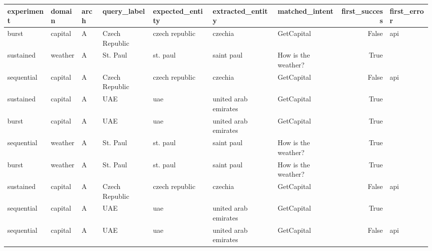\begin{tabular}{lllllllrl}
\toprule
experiment & domain & arch & query_label & expected_entity & extracted_entity & matched_intent & first_success & first_error \\
\midrule
burst & capital & A & Czech Republic & czech republic & czechia & GetCapital & False & api \\
sustained & weather & A & St. Paul & st. paul & saint paul & How is the weather? & True &  \\
sequential & capital & A & Czech Republic & czech republic & czechia & GetCapital & False & api \\
sustained & capital & A & UAE & uae & united arab emirates & GetCapital & True &  \\
burst & capital & A & UAE & uae & united arab emirates & GetCapital & True &  \\
sequential & weather & A & St. Paul & st. paul & saint paul & How is the weather? & True &  \\
burst & weather & A & St. Paul & st. paul & saint paul & How is the weather? & True &  \\
sustained & capital & A & Czech Republic & czech republic & czechia & GetCapital & False & api \\
sequential & capital & A & UAE & uae & united arab emirates & GetCapital & True &  \\
sequential & capital & A & UAE & uae & united arab emirates & GetCapital & False & api \\
\bottomrule
\end{tabular}
